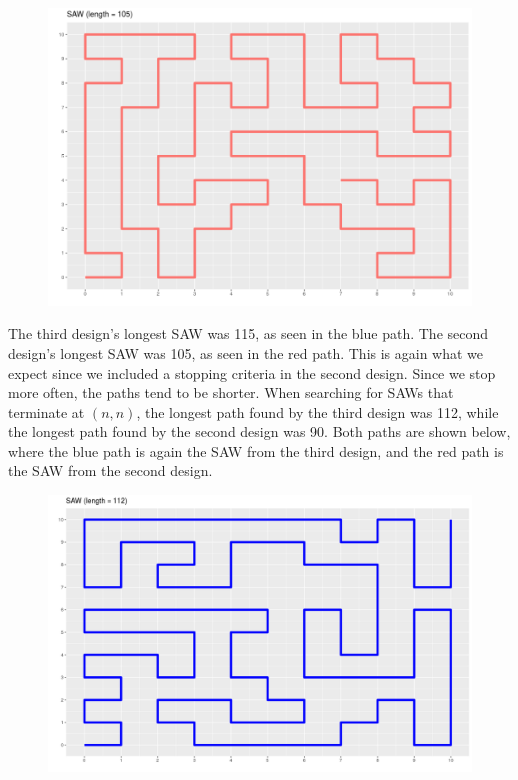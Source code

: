 \documentclass[journal, a4paper]{IEEEtran}
\begin{document}
	\vspace{-0.5in}
	
	\begin{figure}[h]
	\begin{center}
		\includegraphics[width = 0.9\columnwidth]{SAW_105}
	\end{center}
	\end{figure}
	
	The third design's longest SAW was 115, as seen in the blue path. The second design's longest SAW was 105, as seen in the red path. 
	This is again what we expect since we included a stopping criteria in the second design. Since we stop more often, the paths tend to be shorter. When searching for
	SAWs that terminate at $(n,n)$, the longest path found by the third design was 112, while the longest path found by the second design was 90. Both paths are shown below, 
	where the blue path is again the SAW from the third design, and the red path is the SAW from the second design. 
	
		\vspace{-2mm}
	
	\begin{figure}[h]
	\begin{center}
		\includegraphics[width = 0.9\columnwidth]{nn_SAW_112}
	\end{center}
	\end{figure}
	
\end{document}
